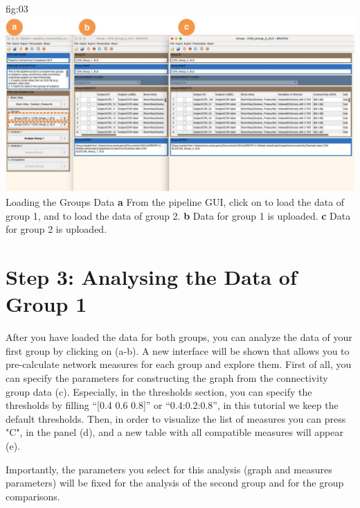 \documentclass[justified]{tufte-handout}
\begin{document}
	{fig:03}
	{
	\includegraphics{fig03.jpg}
	}
	{Loading the Groups Data}
	{
	{\bf a} From the pipeline GUI, click on  to load the data of group 1, and  to load the data of group 2.
	{\bf b} Data for group 1 is uploaded. {\bf c} Data for group 2 is uploaded.
	}

\section{Step 3: Analysing the Data of Group 1}
 
After you have loaded the data for both groups, you can analyze the data of your first group by clicking on  (a-b). A new interface will be shown that allows you to pre-calculate network measures for each group and explore them. First of all, you can specify the parameters for constructing the graph from the connectivity group data (c). Especially, in the thresholds section, you can specify the thresholds by filling “[0.4 0.6 0.8]” or “0.4:0.2:0.8”, in this tutorial we keep the default thresholds. Then, in order to visualize the list of measures you can press "C", in the panel  (d), and a new table with all compatible measures will appear (e). 

Importantly, the parameters you select for this analysis (graph and measures parameters) will be fixed for the analysis of the second group and for the group comparisons.
\end{document}
